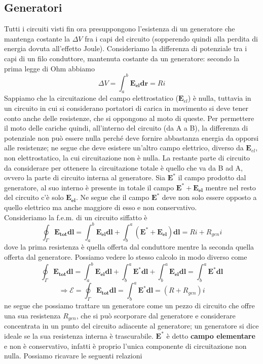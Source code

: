 \documentclass[
10pt, %
a4paper, %
oneside, %
headinclude,footinclude, %
BCOR5mm, %
]{scrartcl}
\begin{document}
\subsection{Generatori}
Tutti i circuiti visti fin ora presuppongono l'esistenza di un generatore che mantenga costante la \(\Delta V\) fra i capi del circuito (sopperendo quindi alla perdita di energia dovuta all'effetto Joule). Consideriamo la differenza di potenziale tra i capi di un filo conduttore, mantenuta costante da un generatore: secondo la prima legge di Ohm abbiamo
\[\Delta V = \int_a^b \mathbf{E_{el}}\mathbf{dr}= Ri\]
Sappiamo che la circuitazione del campo elettrostatico (\(\mathbf{E}_{el}\)) è nulla, tuttavia in un circuito in cui si considerano portatori di carica in movimento si deve tener conto anche delle resistenze, che si oppongono al moto di queste. Per permettere il moto delle cariche quindi, all'interno del circuito (da A a B), la differenza di potenziale non può essere nulla perché deve fornire abbastanza energia da opporsi alle resistenze; ne segue che deve esistere un'altro campo elettrico, diverso da \(\mathbf{E}_{el}\), non elettrostatico, la cui circuitazione non è nulla. La restante parte di circuito da considerare per ottenere la circuitazione totale è quello che va da B ad A, ovvero la parte di circuito interna al generatore. Sia \(\mathbf{E^*}\) il campo prodotto dal generatore, al suo interno è presente in totale il campo \(\mathbf{E^*}+\mathbf{E_{el}}\) mentre nel resto del circuito c'è solo \(\mathbf{E_{el}}\). Ne segue che il campo \(\mathbf{E^*}\) deve non solo essere opposto a quello elettrico ma anche maggiore di esso e non conservativo.\\
Consideriamo la f.e.m. di un circuito siffatto è 
\[\oint_{\Gamma}\mathbf{E_{tot}}\mathbf{dl}= \int_{a}^{b}\mathbf{E_{el}}\mathbf{dl}+\int_{b}^{a}(\mathbf{E^*}+\mathbf{E_{el}})\mathbf{dl}= Ri + R_{gen}i\]
dove la prima resistenza è quella offerta dal conduttore mentre la seconda quella offerta dal generatore. Possiamo vedere lo stesso calcolo in modo diverso come
\[\oint_{\Gamma}\mathbf{E_{tot}}\mathbf{dl}= \int_{a}^{b}\mathbf{E_{el}}\mathbf{dl} + \int_{b}^{a}\mathbf{E^*}\mathbf{dl} +  \int_{b}^{a}\mathbf{E_{el}}\mathbf{dl}= \int_{b}^{a}\mathbf{E^*}\mathbf{dl}\]
\[\Rightarrow \mathcal{E} = \oint_{\Gamma}\mathbf{E_{tot}}\mathbf{dl} = \int_{b}^{a}\mathbf{E^*}\mathbf{dl} = (R + R_{gen})i \]
ne segue che possiamo trattare un generatore come un pezzo di circuito che offre una sua resistenza \(R_{gen}\), che si può scorporare dal generatore e considerare concentrata in un punto del circuito adiacente al generatore; un generatore si dice ideale se la sua resistenza interna è trascurabile. \(\mathbf{E^*}\) è detto \textbf{campo elementare} e non è conservativo, infatti è proprio l'unica componente di circuitazione non nulla. Possiamo ricavare le seguenti relazioni
\end{document}
